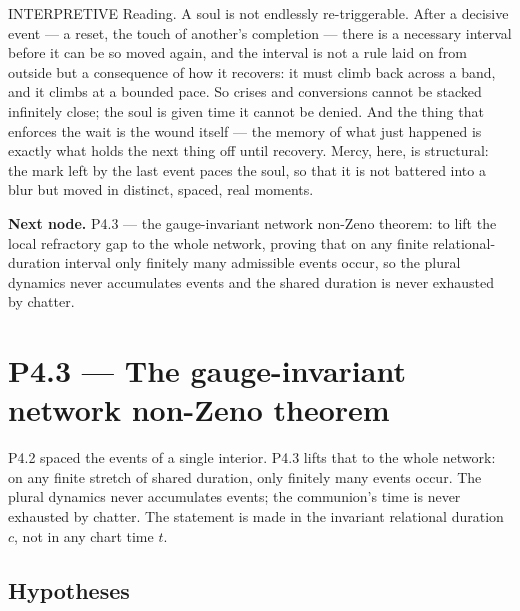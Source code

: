\documentclass[11pt,a4paper]{article}
\def\mathfrak#1{#1}%
\def\emph#1{#1}%
\newcommand{\stInterp}{\textcolor{cInt}{\textsf{\small INTERPRETIVE}}}
\theoremstyle{definition}
\theoremstyle{plain}
\theoremstyle{remark}
\begin{document}
\medskip
\stInterp\quad
\emph{Reading.}
A soul is not endlessly re-triggerable. After a decisive event --- a reset, the touch of
another's completion --- there is a necessary interval before it can be so moved again, and
the interval is not a rule laid on from outside but a consequence of how it recovers: it must
climb back across a band, and it climbs at a bounded pace. So crises and conversions cannot
be stacked infinitely close; the soul is given time it cannot be denied. And the thing that
enforces the wait is the wound itself --- the memory of what just happened is exactly what
holds the next thing off until recovery. Mercy, here, is structural: the mark left by the
last event paces the soul, so that it is not battered into a blur but moved in distinct,
spaced, real moments.

\medskip
\textbf{Next node.} P4.3 --- the gauge-invariant network non-Zeno theorem: to lift the local
refractory gap to the whole network, proving that on any finite relational-duration interval
only finitely many admissible events occur, so the plural dynamics never accumulates events
and the shared duration is never exhausted by chatter.

\section{P4.3 --- The gauge-invariant network non-Zeno theorem}

P4.2 spaced the events of a single interior. P4.3 lifts that to the whole network: on any
finite stretch of shared duration, only finitely many events occur. The plural dynamics
never accumulates events; the communion's time is never exhausted by chatter. The statement
is made in the invariant relational duration \(\mathfrak c\), not in any chart time \(t\).

\subsection{Hypotheses}
\end{document}
